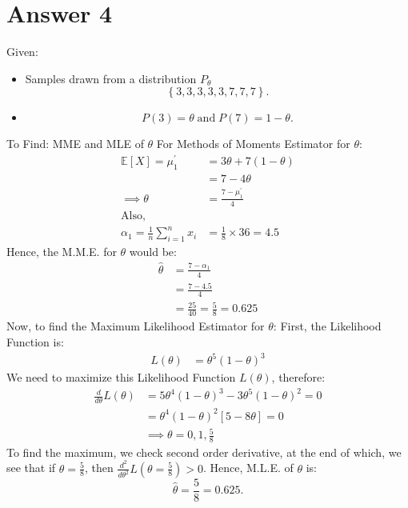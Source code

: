 \documentclass[a4paper]{article}
\begin{document}
\section{Answer 4}
Given:
\begin{itemize}
	\item {Samples drawn from a distribution $P_{\theta}$ 
		\[
			\left\{ 3,3,3,3,3,7,7,7 \right\} 
		.\] 
		}
	\item{\[
		P\left( 3 \right) = \theta \; \text{and}\; P\left( 7 \right) =1-\theta
	.\] }
\end{itemize}
To Find: MME and MLE of $\theta$
 \newline\newline
For Methods of Moments Estimator for $\theta$:
 \begin{equation*}
	\begin{split}
		\mathbb{E}\left[ X \right] =  \mu_1^{\prime} &=  3\theta + 7\left( 1-\theta \right) \\
		&= 7 - 4\theta\\
		\implies \theta &=  \frac{7 - \mu_1^{\prime}}{4}\\
		\text{Also,}\\
		\alpha_1 = \frac{1}{n} \sum_{i=1}^{n} x_{i} &= \frac{1}{8} \times 36 = 4.5
	\end{split}
\end{equation*}
Hence, the M.M.E. for $\theta$ would be:
\begin{equation*}
	\begin{split}
		\hat{\theta} &=  \frac{7-\alpha_1}{4}\\
		&= \frac{7-4.5}{4}\\
		&= \frac{25}{40} = \frac{5}{8} = 0.625
	\end{split}
\end{equation*}
Now, to find the Maximum Likelihood Estimator for $\theta$:
 \newline\newline
 First, the Likelihood Function is:
 \begin{equation*}
 	\begin{split}
 		L\left( \theta \right) &= \theta^{5}\left( 1-\theta \right) ^{3}
 	\end{split}
 \end{equation*}
 We need to maximize this Likelihood Function $L\left( \theta \right)$, therefore:
 \begin{equation*}
 	\begin{split}
 		\frac{d}{d\theta} L\left( \theta \right) &= 5\theta^{4}\left( 1-\theta \right) ^3 - 3\theta^{5}\left( 1-\theta \right) ^2 = 0\\
		&= \theta^{4}\left( 1-\theta \right) ^2 \left[ 5-8\theta \right] = 0\\
		&\implies \theta = 0,1,\frac{5}{8}
 	\end{split}
 \end{equation*}
 To find the maximum, we check second order derivative, at the end of which, we see that if $\theta = \frac{5}{8}$, then $\frac{d^2}{d\theta^2}L\left( \theta = \frac{5}{8} \right) > 0$.
 \newline\newline
 Hence, M.L.E. of $\theta$ is:
 \[
	 \hat{\theta} = \frac{5}{8} = 0.625
 .\]
\end{document}
